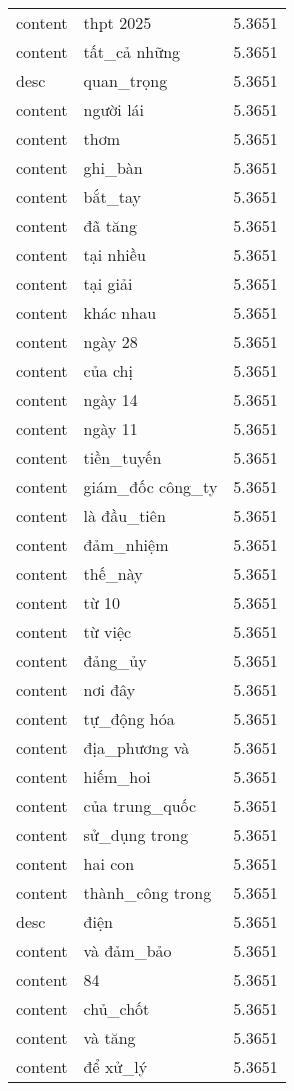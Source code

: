 \documentclass{article}
\begin{document}
\begin{tabular}{lll}
content & thpt 2025 & 5.3651\\
content & tất\_cả những & 5.3651\\
desc & quan\_trọng & 5.3651\\
content & người lái & 5.3651\\
content & thơm & 5.3651\\
content & ghi\_bàn & 5.3651\\
content & bắt\_tay & 5.3651\\
content & đã tăng & 5.3651\\
content & tại nhiều & 5.3651\\
content & tại giải & 5.3651\\
content & khác nhau & 5.3651\\
content & ngày 28 & 5.3651\\
content & của chị & 5.3651\\
content & ngày 14 & 5.3651\\
content & ngày 11 & 5.3651\\
content & tiền\_tuyến & 5.3651\\
content & giám\_đốc công\_ty & 5.3651\\
content & là đầu\_tiên & 5.3651\\
content & đảm\_nhiệm & 5.3651\\
content & thế\_này & 5.3651\\
content & từ 10 & 5.3651\\
content & từ việc & 5.3651\\
content & đảng\_ủy & 5.3651\\
content & nơi đây & 5.3651\\
content & tự\_động hóa & 5.3651\\
content & địa\_phương và & 5.3651\\
content & hiếm\_hoi & 5.3651\\
content & của trung\_quốc & 5.3651\\
content & sử\_dụng trong & 5.3651\\
content & hai con & 5.3651\\
content & thành\_công trong & 5.3651\\
desc & điện & 5.3651\\
content & và đảm\_bảo & 5.3651\\
content & 84 & 5.3651\\
content & chủ\_chốt & 5.3651\\
content & và tăng & 5.3651\\
content & để xử\_lý & 5.3651\\

\end{tabular}
\end{document}
